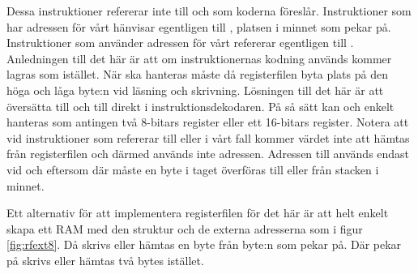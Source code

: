 \documentclass[main.tex]{subfiles}
\begin{document}
Dessa instruktioner refererar inte till  och  som koderna
föreslår. Instruktioner som har adressen för vårt  hänvisar egentligen
till , platsen i minnet som  pekar på. Instruktioner som
använder adressen för vårt  refererar egentligen till .
Anledningen till det här är att om instruktionernas kodning används kommer
 lagras som  istället. När  ska hanteras måste då
registerfilen byta plats på den höga och låga byte:n vid läsning och skrivning.
Lösningen till det här är att översätta  till  och
 till  direkt i instruktionsdekodaren. På så sätt kan
 och  enkelt hanteras som antingen två 8-bitars register eller
ett 16-bitars register. Notera att vid instruktioner som refererar till
 eller i vårt fall  kommer värdet inte att hämtas från
registerfilen och därmed används inte adressen. Adressen till  används
endast vid  och  eftersom där måste en byte i taget
överföras till eller från stacken i minnet.

Ett alternativ för att implementera registerfilen för det här är att helt
enkelt skapa ett RAM med den struktur och de externa adresserna som i figur
\ref{fig:rfext8}. Då skrivs eller hämtas en byte från byte:n som 
pekar på. Där  pekar på skrivs eller hämtas två bytes istället.
\end{document}
